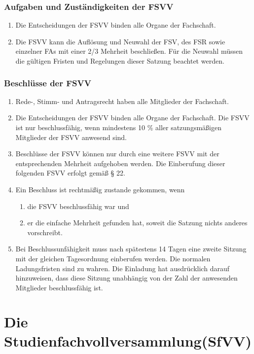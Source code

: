 \documentclass{article}
\begin{document}
\section{Aufgaben und Zuständigkeiten der FSVV}
\begin{enumerate}[(1)]
    \item Die Entscheidungen der FSVV binden alle Organe der Fachschaft.
	\item Die FSVV kann die Auflösung und Neuwahl der FSV, des FSR sowie einzelner FAs mit einer 2/3 Mehrheit beschließen. Für die Neuwahl müssen die gültigen Fristen und Regelungen dieser Satzung beachtet werden.
\end{enumerate}

\section{Beschlüsse der FSVV}

\begin{enumerate}[(1)]
	\item Rede-, Stimm- und Antragsrecht haben alle Mitglieder der Fachschaft.
	\item Die Entscheidungen der FSVV binden alle Organe der Fachschaft. Die FSVV ist nur beschlussfähig, wenn mindestens 10 \% aller satzungsmäßigen Mitglieder der FSVV anwesend sind.
	\item Beschlüsse der FSVV können nur durch eine weitere FSVV mit der entsprechenden Mehrheit aufgehoben werden. Die Einberufung dieser folgenden FSVV erfolgt gemäß § 22.
	\item Ein Beschluss ist rechtmäßig zustande gekommen, wenn
	\begin{enumerate}[1.]
		\item die FSVV beschlussfähig war und
		\item er die einfache Mehrheit gefunden hat, soweit die Satzung nichts anderes vorschreibt.
	\end{enumerate}
	\item Bei Beschlussunfähigkeit muss nach spätestens 14 Tagen eine zweite Sitzung mit der gleichen Tagesordnung einberufen werden. Die normalen Ladungsfristen sind zu wahren. Die Einladung hat ausdrücklich darauf hinzuweisen, dass diese Sitzung unabhängig von der Zahl der anwesenden Mitglieder beschlussfähig ist.
\end{enumerate}

\part{Die Studienfachvollversammlung(SfVV)}
\end{document}
